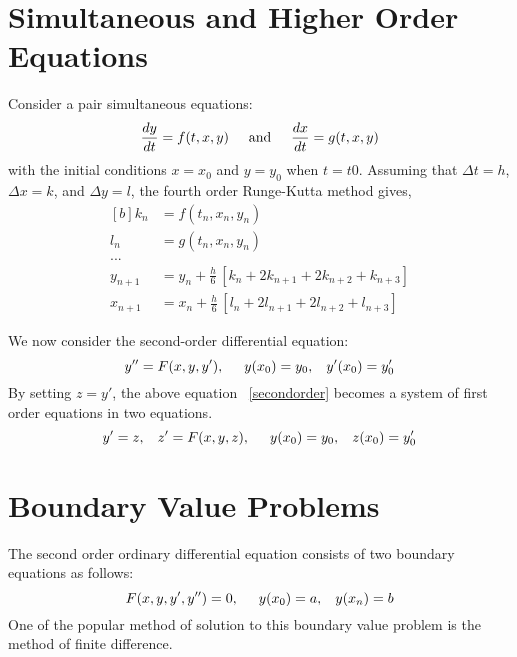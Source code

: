 \documentclass[aima203_lecturenotes_ku.tex]{subfiles}
\begin{document}
\section{Simultaneous and Higher Order Equations}
Consider a pair simultaneous equations:
\begin{equation}
  \label{simul}
  \frac{dy}{dt} = f(t,x,y) \hspace{5mm} \text{and} \hspace{5mm}  \frac{dx}{dt} = g(t,x,y)
\end{equation}
with the initial conditions $x=x_0$ and $y=y_0$ when $t=t0$. Assuming that $\Delta t =h$, $\Delta x=k$, and $\Delta y = l$, the fourth order Runge-Kutta method gives,
\begin{equation}
  \label{rungesimul}
  \begin{aligned}[b]
    k_n &= f(t_n,x_n,y_n) \\[1mm]
    l_n &= g(t_n,x_n,y_n) \\[1mm]
    ... \\[2mm]
    y_{n+1} &= y_n + \frac{h}{6} \,\left [k_n + 2k_{n+1} + 2k_{n+2} + k_{n+3}\right ] \\[1mm]
    x_{n+1} &= x_n + \frac{h}{6} \,\left [l_n + 2l_{n+1} + 2l_{n+2} + l_{n+3}\right ]
  \end{aligned}
\end{equation}

We now consider the second-order differential equation:
\begin{equation}
  \label{secondorder}
  y''=F(x,y,y'), \hspace{5mm} y(x_0)=y_0, \hspace{3mm} y'(x_0) = y'_0
\end{equation}
By setting $z=y'$, the above equation ~\ref{secondorder} becomes a system of first order equations in two equations.
\begin{equation}
  \label{secondorderreduced}
  y'=z, \hspace{3mm} z'=F(x,y,z), \hspace{5mm} y(x_0)=y_0, \hspace{3mm} z(x_0) = y'_0
\end{equation}

\section{Boundary Value Problems}
The second order ordinary differential equation consists of two boundary equations as follows:
$$F(x,y,y',y'')=0, \hspace{5mm} y(x_0) = a, \hspace{3mm} y(x_{n}) = b $$
One of the popular method of solution to this boundary value problem is the method of finite difference.
\end{document}
